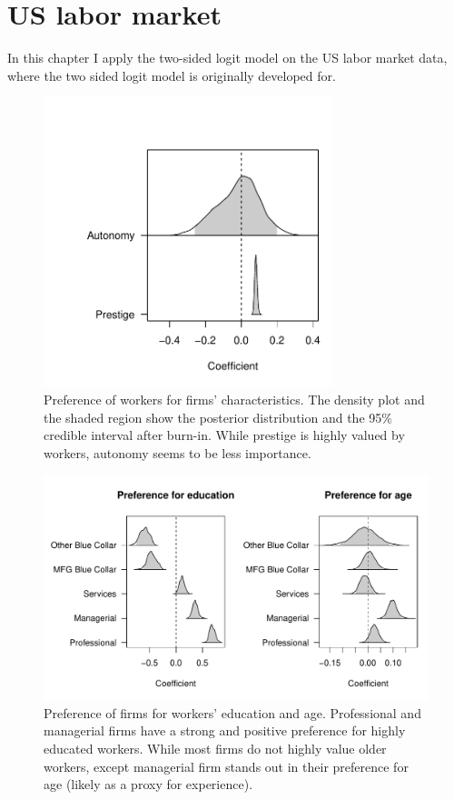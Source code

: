 \chapter{US labor market}
\label{chap:labor}

In this chapter I apply the two-sided logit model on the US labor market data, where the two sided logit model is originally developed for.

\begin{figure}[!ht]
  \centering
  \includegraphics[width=0.75\textwidth,keepaspectratio]{../figure/labor_occ5_alpha}
  \caption[Workers' preference in the US labor market.]{Preference of workers for firms' characteristics. The density plot and the
    shaded region show the posterior distribution and the 95\% credible interval
    after burn-in. While prestige is highly valued by workers, autonomy seems to
    be less importance.}
  \label{fig:labor_occ5_alpha}
\end{figure}

\begin{figure}[!ht]
  \centering
  \includegraphics[width=\textwidth,keepaspectratio]{../figure/labor_occ5_beta_educ_age}
  \caption[Firms' preference in the US labor market]{Preference of firms for workers' education and
    age. Professional and managerial firms have a strong and positive preference
  for highly educated workers. While most firms do not highly value older workers,
  except managerial firm stands out in their preference for age (likely as a
  proxy for experience).}
  \label{fig:labor_occ5_beta_educ_age}
\end{figure}

